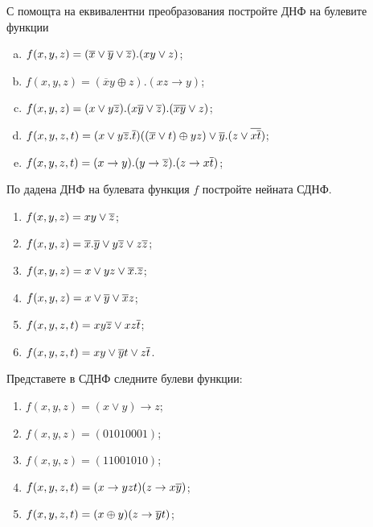 \begin{problem} %
  С помощта на еквивалентни преобразования постройте ДНФ на булевите функции
  \begin{enumerate}[a)]
  \item
    $f(x,y,z) = (\overline{x}\vee\overline{y}\vee\overline{z}).(xy\vee z)$;
  \item
    $f(x,y,z) = (\overline{x}y\oplus z).(xz\rightarrow y)$;
  \item
    $f(x,y,z) = (x\vee y\overline{z}).(x\overline{y}\vee\overline{z}).(\overline{xy}\vee z)$;
  \item
    $f(x,y,z,t) = (x\vee y\overline{z}.\overline{t})((\overline{x}\vee t)\oplus yz)\vee \overline{y}.(z\vee \overline{x\overline{t}})$;
  \item
    $f(x,y,z,t) = (x\rightarrow y).(y\rightarrow \overline{z}).(z\rightarrow x\overline{t})$;
  \end{enumerate}
\end{problem}

\begin{problem}%
  По дадена ДНФ на булевата функция $f$ постройте нейната СДНФ.
  \begin{enumerate}[1)]
  \item
    $f(x,y,z) = xy\vee\overline{z}$;
  \item
    $f(x,y,z) = \overline{x}.\overline{y} \vee y\overline{z} \vee z\overline{z}$;
  \item
    $f(x,y,z) = x\vee yz \vee \overline{x}.\overline{z}$;
  \item
    $f(x,y,z) = x\vee \overline{y}\vee \overline{x}z$;
  \item
    $f(x,y,z,t) = xy\overline{z} \vee xz\overline{t}$;
  \item
    $f(x,y,z,t) = xy \vee \overline{y}t \vee z\overline{t}$.
  \end{enumerate}
\end{problem}


\begin{problem}
  Представете в СДНФ следните булеви функции:
  \begin{enumerate}[1)]
  \item
    $f(x,y,z) = (x\vee y)\rightarrow z$;
  \item
    $f(x,y,z) = (01010001)$;
  \item
    $f(x,y,z) = (11001010)$;
  \item
    $f(x,y,z,t) = (x\rightarrow yzt)(z\rightarrow x\overline{y})$;
  \item
    $f(x,y,z,t) = (x\oplus y)(z\rightarrow \overline{y}t)$;
  \end{enumerate}
\end{problem}

